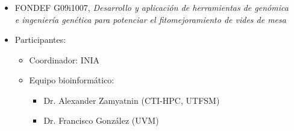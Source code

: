 \frame
{
\frametitle{}

\begin{columns}
\begin{itemize}
\item FONDEF G09i1007,  \emph{Desarrollo y aplicaci\'{o}n de herramientas de gen\'{o}mica e ingenier\'{i}a gen\'{e}tica para potenciar el fitomejoramiento de vides de mesa}
\item Participantes:
	\begin{itemize}
	\item Coordinador: INIA
	\item Equipo bioinform\'{a}tico: 
		\begin{itemize}
		\item Dr. Alexander Zamyatnin (CTI-HPC, UTFSM)
		\item Dr. Francisco González (UVM)
		\end{itemize}
	\end{itemize}
\end{itemize}
\begin{center}
\end{center}
\end{columns}
}

